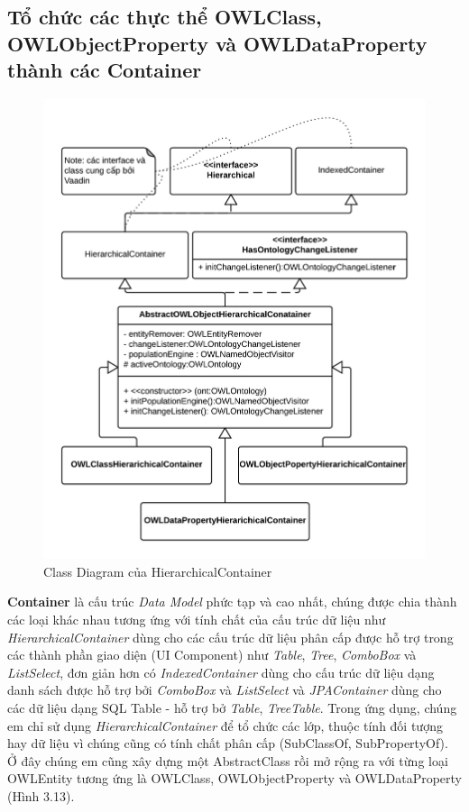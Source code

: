 {\subsection{Tổ chức các thực thể OWLClass, OWLObjectProperty và OWLDataProperty thành các Container}
\begin{figure}[h!]
	\centering
	\includegraphics[width=150mm]{Figures/uml_owleditor_abstractcontainer_nobackground.png}
	\caption{Class Diagram của HierarchicalContainer \label{overflow}}
\end{figure}
\textbf{Container} là cấu trúc \textit{Data Model} phức tạp và cao nhất, chúng được chia thành các loại khác nhau tương ứng với tính chất của cấu trúc dữ liệu như \textit{HierarchicalContainer} dùng cho các cấu trúc dữ liệu phân cấp được hỗ trợ trong các thành phần giao diện (UI Component) như \textit{Table}, \textit{Tree}, \textit{ComboBox} và \textit{ListSelect}, đơn giản hơn có \textit{IndexedContainer} dùng cho cấu trúc dữ liệu dạng danh sách được hỗ trợ bởi \textit{ComboBox} và \textit{ListSelect} và \textit{JPAContainer} dùng cho các dữ liệu dạng SQL Table - hỗ trợ bở \textit{Table}, \textit{TreeTable}. Trong ứng dụng, chúng em chỉ sử dụng \textit{HierarchicalContainer} để tổ chức các lớp, thuộc tính đối tượng hay dữ liệu vì chúng cũng có tính chất phân cấp (SubClassOf, SubPropertyOf). Ở đây chúng em cũng xây dựng một AbstractClass rồi mở rộng ra với từng loại OWLEntity tương ứng là OWLClass, OWLObjectProperty và OWLDataProperty (Hình 3.13).

}
